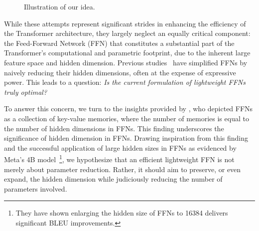 \documentclass[11pt]{article}
\begin{document}
\begin{figure}[ht!]
	\caption{Illustration of our idea.}
 \label{fig:merit}
\end{figure} 
While these attempts represent significant strides in enhancing the efficiency of the Transformer architecture, they largely neglect an equally critical component: the Feed-Forward Network (FFN) that constitutes a substantial part of the Transformer's computational and parametric footprint, due to the inherent large feature space and hidden dimension.
Previous studies~\cite{Mehta2021Delight, Wu2020Lite, ge-etal-2022-edgeformer} have simplified FFNs by naively reducing their hidden dimensions, often at the expense of expressive power.
This leads to a question: \textit{Is the current formulation of lightweight FFNs truly optimal?}


To answer this concern, we turn to the insights provided by \citet{geva-etal-2021-transformer}, who depicted FFNs as a collection of key-value memories, where the number of memories is equal to the number of hidden dimensions in FFNs. This finding underscores the significance of hidden dimension in FFNs.
Drawing inspiration from this finding and the successful application of large hidden sizes in FFNs as evidenced by Meta's 4B model~\cite{tran-etal-2021-facebook}\footnote{They 
have shown enlarging the hidden size of FFNs to 16384 delivers significant BLEU improvements.}, 
we hypothesize that an efficient lightweight FFN is not merely about parameter reduction. Rather, it should aim to preserve, or even expand, the hidden dimension while judiciously reducing the number of parameters involved.
\end{document}

